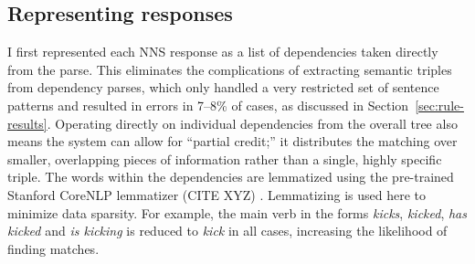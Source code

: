 \subsection{Representing responses}
\label{sec:representation}

I first represented each NNS response as a list of dependencies taken directly from the parse. 
This eliminates the complications of extracting semantic triples from
dependency parses, which only handled a very restricted set of
sentence patterns and resulted in errors in 7--8\% of cases, as discussed in Section~\ref{sec:rule-results}.
Operating directly on individual dependencies from the overall tree also means the system can allow for ``partial credit;'' it distributes the matching over smaller,
overlapping pieces of information rather than a single, highly specific triple. The words within the dependencies are lemmatized using the pre-trained Stanford CoreNLP lemmatizer (CITE XYZ) . Lemmatizing is used here to minimize data sparsity. For example, the main verb in the forms \textit{kicks}, \textit{kicked}, \textit{has kicked} and \textit{is kicking} is reduced to \textit{kick} in all cases, increasing the likelihood of finding matches.

